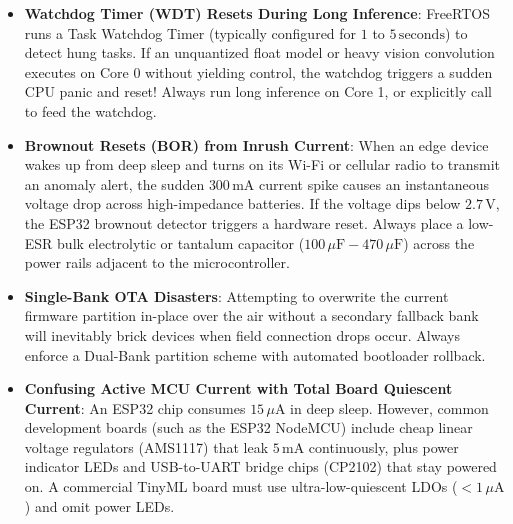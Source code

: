 \begin{warning}
\begin{itemize}
    \item \textbf{Watchdog Timer (WDT) Resets During Long Inference}:
    FreeRTOS runs a Task Watchdog Timer (typically configured for $1$ to $5\,\text{seconds}$) to detect hung tasks. If an unquantized float model or heavy vision convolution executes on Core 0 without yielding control, the watchdog triggers a sudden CPU panic and reset! Always run long inference on Core 1, or explicitly call  to feed the watchdog.
    \item \textbf{Brownout Resets (BOR) from Inrush Current}:
    When an edge device wakes up from deep sleep and turns on its Wi-Fi or cellular radio to transmit an anomaly alert, the sudden $300\,\text{mA}$ current spike causes an instantaneous voltage drop across high-impedance batteries. If the voltage dips below $2.7\,\text{V}$, the ESP32 brownout detector triggers a hardware reset. Always place a low-ESR bulk electrolytic or tantalum capacitor ($100\,\mu\text{F} - 470\,\mu\text{F}$) across the power rails adjacent to the microcontroller.
    \item \textbf{Single-Bank OTA Disasters}:
    Attempting to overwrite the current firmware partition in-place over the air without a secondary fallback bank will inevitably brick devices when field connection drops occur. Always enforce a Dual-Bank partition scheme with automated bootloader rollback.
    \item \textbf{Confusing Active MCU Current with Total Board Quiescent Current}:
    An ESP32 chip consumes $15\,\mu\text{A}$ in deep sleep. However, common development boards (such as the ESP32 NodeMCU) include cheap linear voltage regulators (AMS1117) that leak $5\,\text{mA}$ continuously, plus power indicator LEDs and USB-to-UART bridge chips (CP2102) that stay powered on. A commercial TinyML board must use ultra-low-quiescent LDOs ($< 1\,\mu\text{A}$) and omit power LEDs.
\end{itemize}
\end{warning}

